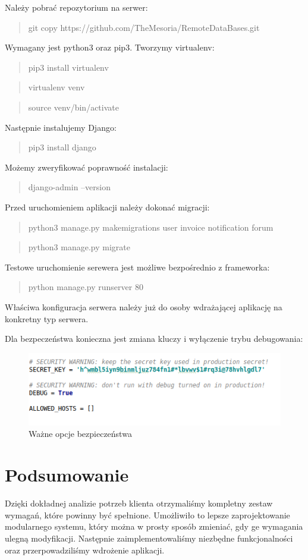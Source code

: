 \documentclass[12pt]{article}
\begin{document}
Należy pobrać repozytorium na serwer:
\begin{quote}
	git copy https://github.com/TheMesoria/RemoteDataBases.git
\end{quote}
Wymagany jest python3 oraz pip3. Tworzymy virtualenv:
\begin{quote}pip3 install virtualenv\end{quote}
\begin{quote}virtualenv venv\end{quote}
\begin{quote}source venv/bin/activate\end{quote}
Następnie instalujemy Django:
\begin{quote}pip3 install django\end{quote}
Możemy zweryfikować poprawność instalacji:
\begin{quote}django-admin --version\end{quote}
Przed uruchomieniem aplikacji należy dokonać migracji:
\begin{quote}python3 manage.py makemigrations user invoice notification forum\end{quote}
\begin{quote}python3 manage.py migrate\end{quote}
Testowe uruchomienie serewera jest możliwe bezpośrednio z frameworka:
\begin{quote}python manage.py runserver 80\end{quote}
Właściwa konfiguracja serwera należy już do osoby wdrażającej aplikację na konkretny typ serwera.

Dla bezpeczeństwa konieczna jest zmiana kluczy i wyłączenie trybu debugowania:
\begin{figure}[H]
	\centering
	\includegraphics[scale=0.7]{img/c_security.png}
	\caption{Ważne opcje bezpieczeństwa}
\end{figure}

\section{Podsumowanie}
Dzięki dokładnej analizie potrzeb klienta otrzymaliśmy kompletny zestaw wymagań, które powinny być spełnione. Umożliwiło to lepsze zaprojektowanie modularnego systemu, który można w prosty sposób zmieniać, gdy ge wymagania ulegną modyfikacji. Następnie zaimplementowaliśmy niezbędne funkcjonalności oraz przerpowadziliśmy wdrożenie aplikacji.
\end{document}
